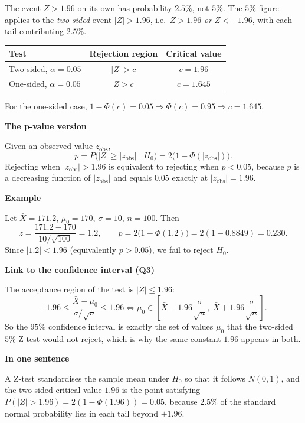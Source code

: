 \documentclass[11pt]{article}
\begin{document}
The event \(Z>1.96\) on its own has probability \(2.5\%\), not \(5\%\). The \(5\%\) figure applies to the \emph{two-sided} event \(|Z|>1.96\), i.e.\ \(Z>1.96\) \emph{or} \(Z<-1.96\), with each tail contributing \(2.5\%\).

\begin{center}
\begin{tabular}{lcc}
\hline
Test & Rejection region & Critical value \\
\hline
Two-sided, \(\alpha=0.05\) & \(|Z|>c\) & \(c=1.96\) \\
One-sided, \(\alpha=0.05\) & \(Z>c\) & \(c=1.645\) \\
\hline
\end{tabular}
\end{center}

For the one-sided case, \(1-\Phi(c)=0.05\Rightarrow\Phi(c)=0.95\Rightarrow c=1.645\).

\textbf{The p-value version}

Given an observed value \(z_{\text{obs}}\),
\[
p=P\big(|Z|\ge|z_{\text{obs}}|\mid H_0\big)=2\big(1-\Phi(|z_{\text{obs}}|)\big).
\]
Rejecting when \(|z_{\text{obs}}|>1.96\) is equivalent to rejecting when \(p<0.05\), because \(p\) is a decreasing function of \(|z_{\text{obs}}|\) and equals \(0.05\) exactly at \(|z_{\text{obs}}|=1.96\).

\textbf{Example}

Let \(\bar X=171.2\), \(\mu_0=170\), \(\sigma=10\), \(n=100\). Then
\[
z=\frac{171.2-170}{10/\sqrt{100}}=1.2,
\qquad
p=2\big(1-\Phi(1.2)\big)=2(1-0.8849)=0.230.
\]
Since \(|1.2|<1.96\) (equivalently \(p>0.05\)), we fail to reject \(H_0\).

\textbf{Link to the confidence interval (Q3)}

The acceptance region of the test is \(|Z|\le1.96\):
\[
-1.96\le\frac{\bar X-\mu_0}{\sigma/\sqrt n}\le1.96
\iff
\mu_0\in\left[\bar X-1.96\frac{\sigma}{\sqrt n},\ \bar X+1.96\frac{\sigma}{\sqrt n}\right].
\]
So the \(95\%\) confidence interval is exactly the set of values \(\mu_0\) that the two-sided \(5\%\) Z-test would not reject, which is why the same constant \(1.96\) appears in both.

\textbf{In one sentence}

A Z-test standardises the sample mean under \(H_0\) so that it follows \(N(0,1)\), and the two-sided critical value \(1.96\) is the point satisfying \(P(|Z|>1.96)=2(1-\Phi(1.96))=0.05\), because \(2.5\%\) of the standard normal probability lies in each tail beyond \(\pm1.96\).
\end{document}
